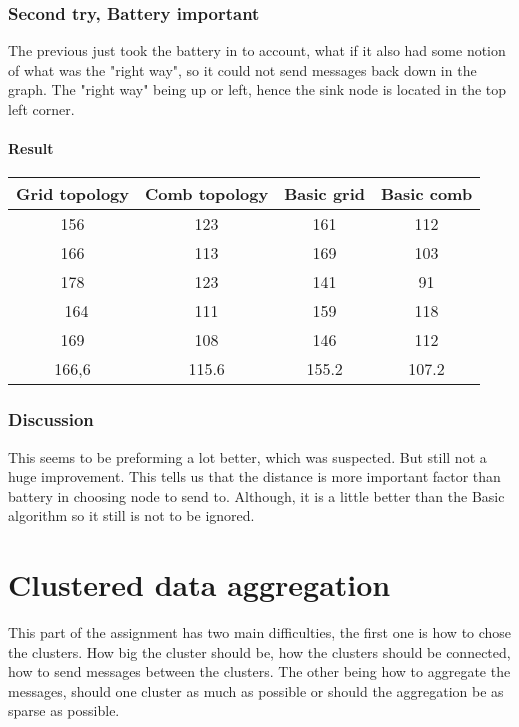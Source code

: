 \documentclass{article}
\begin{document}
\section{Second try, Battery important}
  The previous just took the battery in to account, what if it also had
  some notion of what was the "right way", so it could not send messages
  back down in the graph. The "right way" being up or left, hence the sink
  node is located in the top left corner.
  \subsection{Result}
    \begin{tabular}{c|c||c|c}
      Grid topology & Comb topology & Basic grid & Basic comb\\
      \hline
      \hline
      156 & 123 & 161 & 112\\
      166 & 113 & 169 & 103\\
      178 & 123 & 141 & 91\\\
      164 & 111 & 159 & 118\\
      169 & 108 & 146 & 112\\
      \hline
      166,6&115.6&155.2&107.2\\
    \end{tabular}
    \section{Discussion}
      This seems to be preforming a lot better, which was suspected. But still not a huge
      improvement. This tells us that the distance is more important factor than battery
      in choosing node to send to. Although, it is a little better than the Basic algorithm
      so it still is not to be ignored.
\part{Clustered data aggregation}
  This part of the assignment has two main difficulties, the first one is 
  how to chose the clusters. How big the cluster should be, how the clusters
  should be connected, how to send messages between the clusters.
  The other being how to aggregate the messages, should one cluster as much
  as possible or should the aggregation be as sparse as possible.
\end{document}
